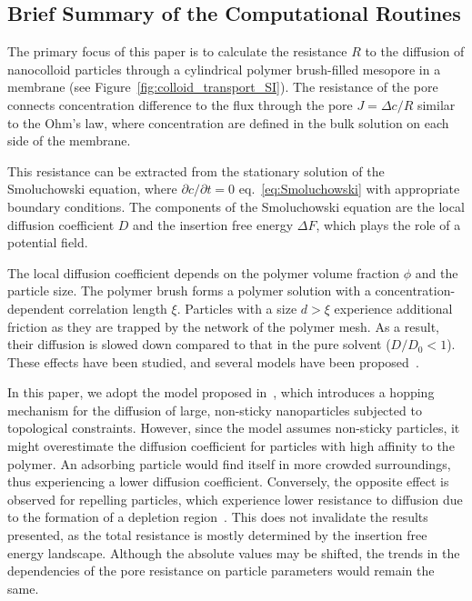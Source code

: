 \documentclass[10pt, a4paper]{article}
\begin{document}
\subsection*{Brief Summary of the Computational Routines}
\begin{multicols}{2}

The primary focus of this paper is to calculate the resistance $R$ to the diffusion of nanocolloid particles through a cylindrical polymer brush-filled mesopore in a membrane (see Figure~\ref{fig:colloid_transport_SI}).
The resistance of the pore connects concentration difference to the flux through the pore $J = \Delta c / R$ similar to the Ohm's law, where concentration are defined in the bulk solution on each side of the membrane.

This resistance can be extracted from the stationary solution of the Smoluchowski equation, where $\partial c/\partial t = 0$ eq.~\ref{eq:Smoluchowski} with appropriate boundary conditions.
The components of the Smoluchowski equation are the local diffusion coefficient $D$ and the insertion free energy $\Delta F$, which plays the role of a potential field.

The local diffusion coefficient depends on the polymer volume fraction $\phi$ and the particle size.
The polymer brush forms a polymer solution with a concentration-dependent correlation length $\xi$.
Particles with a size $d > \xi$ experience additional friction as they are trapped by the network of the polymer mesh.
As a result, their diffusion is slowed down compared to that in the pure solvent ($D/D_0 < 1$).
These effects have been studied, and several models have been proposed~\cite{Kohli2012,Cai2011,Holyst2009,Phillies1988}.

In this paper, we adopt the model proposed in~\cite{Cai2011}, which introduces a hopping mechanism for the diffusion of large, non-sticky nanoparticles subjected to topological constraints.
However, since the model assumes non-sticky particles, it might overestimate the diffusion coefficient for particles with high affinity to the polymer.
An adsorbing particle would find itself in more crowded surroundings, thus experiencing a lower diffusion coefficient.
Conversely, the opposite effect is observed for repelling particles, which experience lower resistance to diffusion due to the formation of a depletion region~\cite{Holyst2011}.
This does not invalidate the results presented, as the total resistance is mostly determined by the insertion free energy landscape.
Although the absolute values may be shifted, the trends in the dependencies of the pore resistance on particle parameters would remain the same.


\end{multicols}
\end{document}
